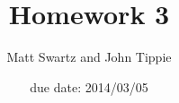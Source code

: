 
         \newcommand\alg[1]{\ensuremath{\mathbf{#1}}}
         \newcommand{\<}{\ensuremath{\langle}}
         \renewcommand{\>}{\ensuremath{\rangle}}
         \newcommand\fld[1]{\ensuremath{\mathbb{#1}}}
         \newcommand\Z{\fld{Z}}
         \newcommand\R{\fld{R}}
         \newcommand\C{\fld{C}}
         \newcommand\Q{\fld{Q}}
         \newcommand\N{\fld{N}}
         \newcommand\GF{\ensuremath{\operatorname{GF}}}
         \author{Matt Swartz and John Tippie}
         \title{Homework 3}
         \date{due date: 2014/03/05}



